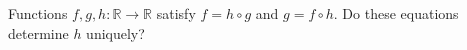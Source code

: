 Functions $f,g,h:\mathbb{R}\to\mathbb{R}$ satisfy $f=h\circ g$ and $g=f\circ h$. Do these equations determine $h$ uniquely?
